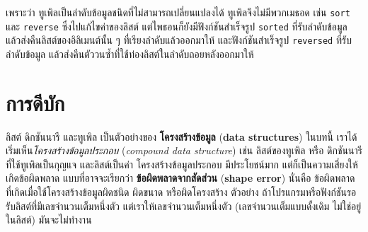 เพราะว่า ทูเพิลเป็นลำดับข้อมูลชนิดที่ไม่สามารถเปลี่ยนแปลงได้
ทูเพิลจึงไม่มีพวกเมธอด เช่น \texttt{sort} และ \texttt{reverse}
ซึ่งไปแก้ไขค่าของลิสต์
แต่ไพธอนก็ยังมีฟังก์ชันสำเร็จรูป \texttt{sorted} 
ที่รับลำดับข้อมูล แล้วส่งคืนลิสต์ของอิลิเมนต์นั้น ๆ ที่เรียงลำดับแล้วออกมาให้
และฟังก์ชันสำเร็จรูป \texttt{reversed} ที่รับลำดับข้อมูล แล้วส่งคืนตัววนซ้ำที่ใช้ท่องลิสต์ในลำดับถอยหลังออกมาให้
%
 

\section{การดีบัก}


ลิสต์ ดิกชันนารี และทูเพิล เป็นตัวอย่างของ \textbf{โครงสร้างข้อมูล} (\textbf{data structures})
ในบทนี้ เราได้เริ่มเห็น\textit{โครงสร้างข้อมูลประกอบ} (\textit{compound data structure})
เช่น ลิสต์ของทูเพิล หรือ ดิกชันนารีที่ใช้ทูเพิลเป็นกุญแจ และลิสต์เป็นค่า
โครงสร้างข้อมูลประกอบ มีประโยชน์มาก
แต่ก็เป็นความเสี่ยงให้เกิดข้อผิดพลาด แบบที่อาจจะเรียกว่า \textbf{ข้อผิดพลาดจากสัดส่วน} (\textbf{shape error})
นั่นคือ ข้อผิดพลาด ที่เกิดเมื่อใช้โครงสร้างข้อมูลผิดชนิด ผิดขนาด หรือผิดโครงสร้าง
ตัวอย่าง 
ถ้าโปรแกรมหรือฟังก์ชันรอรับลิสต์ที่มีเลขจำนวนเต็มหนึ่งตัว 
แต่เราให้เลขจำนวนเต็มหนึ่งตัว (เลขจำนวนเต็มแบบดั้งเดิม ไม่ใช่อยู่ในลิสต์)
มันจะไม่ทำงาน
%



